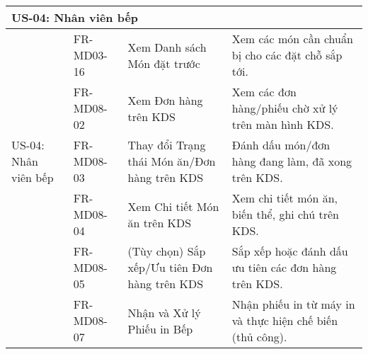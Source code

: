 \begin{longtable}{|m{2.5cm}|m{2.5cm}|m{5cm}|m{5cm}|}
\multicolumn{4}{|l|}{\textbf{US-04: Nhân viên bếp}} \\ \hline
\multirow{5}{=}[2pt]{US-04: Nhân viên bếp} & FR-MD03-16 & Xem Danh sách Món đặt trước & Xem các món cần chuẩn bị cho các đặt chỗ sắp tới. \\ \cline{2-4}
& FR-MD08-02 & Xem Đơn hàng trên KDS & Xem các đơn hàng/phiếu chờ xử lý trên màn hình KDS. \\
& FR-MD08-03 & Thay đổi Trạng thái Món ăn/Đơn hàng trên KDS & Đánh dấu món/đơn hàng đang làm, đã xong trên KDS. \\
& FR-MD08-04 & Xem Chi tiết Món ăn trên KDS & Xem chi tiết món ăn, biến thể, ghi chú trên KDS. \\
& FR-MD08-05 & (Tùy chọn) Sắp xếp/Ưu tiên Đơn hàng trên KDS & Sắp xếp hoặc đánh dấu ưu tiên các đơn hàng trên KDS. \\
& FR-MD08-07 & Nhận và Xử lý Phiếu in Bếp & Nhận phiếu in từ máy in và thực hiện chế biến (thủ công). \\
\hline


\end{longtable}
